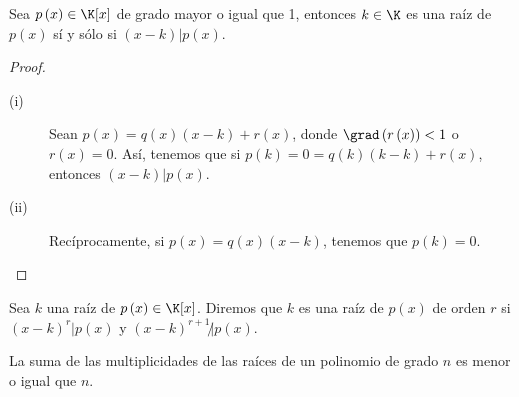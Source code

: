 \begin{fprop}[]
	\normalfont Sea $\displaystyle p\left(x\right) \in \K[x] $ de grado mayor o igual que 1, entonces $\displaystyle k \in \K $ es una raíz de $\displaystyle p\left(x\right) $ sí y sólo si $\displaystyle \left(x-k\right) | p\left(x\right) $.
\end{fprop}
\begin{proof}
\begin{description}
\item[(i)] Sean $\displaystyle p\left(x\right) = q\left(x\right)\left(x-k\right) + r\left(x\right) $, donde $\displaystyle \grad\left(r\left(x\right)\right) < 1 $ o $\displaystyle r\left(x\right) = 0 $. Así, tenemos que si $\displaystyle p\left(k\right) = 0 = q\left(k\right)\left(k-k\right) + r\left(x\right) $, entonces $\displaystyle \left(x-k\right) | p\left(x\right) $. 
\item[(ii)] Recíprocamente, si $\displaystyle p\left(x\right) = q\left(x\right)\left(x-k\right) $, tenemos que $\displaystyle p\left(k\right) = 0 $. 
\end{description}
\end{proof}
\begin{fdefinition}[]
	\normalfont Sea $\displaystyle k $ una raíz de $\displaystyle p\left(x\right) \in \K[x] $. Diremos que $\displaystyle k $ es una raíz de $\displaystyle p\left(x\right) $ de orden $\displaystyle r $ si $\displaystyle \left(x -k\right)^{r} | p\left(x\right) $ y $\displaystyle \left(x-k\right)^{r+1} \not | p\left(x\right) $. 
\end{fdefinition}
\begin{observation}
\normalfont La suma de las multiplicidades de las raíces de un polinomio de grado $\displaystyle n $ es menor o igual que $\displaystyle n $.
\end{observation}
